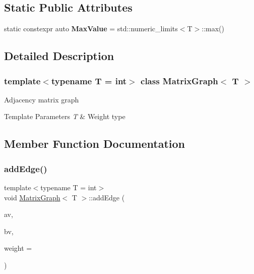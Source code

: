 \subsection*{Static Public Attributes}
\begin{DoxyCompactItemize}
\item 
\mbox{\label{class_matrix_graph_ab6d0f5b70345a14bf8a00c293fc78c9d}} 
static constexpr auto {\bfseries Max\+Value} = std\+::numeric\+\_\+limits$<$T$>$\+::max()
\end{DoxyCompactItemize}


\subsection{Detailed Description}
\subsubsection*{template$<$typename T = int$>$\newline
class Matrix\+Graph$<$ T $>$}

Adjacency matrix graph 
\begin{DoxyTemplParams}{Template Parameters}
{\em T} & Weight type \\
\hline
\end{DoxyTemplParams}


\subsection{Member Function Documentation}
\mbox{\label{class_matrix_graph_af4d5e646d3bc3618b83c94610108e089}} 
\subsubsection{\texorpdfstring{add\+Edge()}{addEdge()}}
{\footnotesize\ttfamily template$<$typename T = int$>$ \\
void \hyperlink{class_matrix_graph}{Matrix\+Graph}$<$ T $>$\+::add\+Edge (\begin{DoxyParamCaption}\item[{size\+\_\+t}]{av,  }\item[{size\+\_\+t}]{bv,  }\item[{const T \&}]{weight = {} }\end{DoxyParamCaption})\hspace{0.3cm}{\ttfamily [inline]}}

